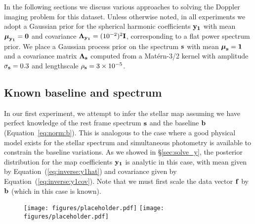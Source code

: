 \documentclass[modern]{aastex62}
\begin{document}

In the following sections we discuss various approaches to
solving the Doppler imaging problem for this dataset.
Unless otherwise noted, in all experiments we adopt a Gaussian prior
for the spherical harmonic coefficients ${\mathbf{y_1}}$ with mean
$\boldsymbol{\mu}_{\mathbf{y_1}} = {\mathbf{0}}$ and covariance
$\boldsymbol{\Lambda}_{\mathbf{y_1}} = (10^{-2})^2{\mathbf{I}}$,
corresponding to a flat power spectrum prior.
We place a Gaussian process prior on the spectrum ${\mathbf{s}}$ with mean
$\boldsymbol{\mu}_{\mathbf{s}} = {\mathbf{1}}$ and a covariance matrix
$\boldsymbol{\Lambda}_{\mathbf{s}}$ computed from
a Mat\'ern-3/2 kernel with amplitude $\sigma_{\mathbf{s}} = 0.3$
and lengthscale $\rho_{\mathbf{s}} = 3\times 10^{-5}$.

\subsection{Known baseline and spectrum}
\label{sec:spot_y1}
%
In our first experiment, we attempt to infer the stellar map assuming
we have perfect knowledge of the rest frame spectrum ${\mathbf{s}}$ and
the baseline ${\mathbf{b}}$ (Equation~\ref{eq:norm:b}).
This is analogous to the case where a good physical model exists for
the stellar spectrum and simultaneous photometry is available to
constrain the baseline variations.
As we showed in
\S\ref{sec:solve_y}, the posterior distribution for the map coefficients
${\mathbf{y_1}}$ is analytic in this case, with mean given by Equation~(\ref{eq:inverse:y1hat})
and covariance given by Equation~(\ref{eq:inverse:y1cov}). Note that
we must first scale the data vector ${\mathbf{f}}$ by ${\mathbf{b}}$ (which in this
case is known).

\begin{figure}[p!]
    \begin{centering}
        \texttt{[image: figures/placeholder.pdf]} %
        \texttt{[image: figures/placeholder.pdf]} %
    \end{centering}
\end{figure}
\end{document}
